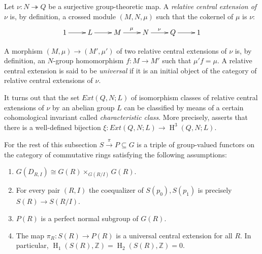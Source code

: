 \documentclass[oneside, 8pt]{amsart}
\theoremstyle{remark}
\theoremstyle{definition}
\numberwithin{lemma}{section}
\numberwithin{prop}{section}
\numberwithin{corollary}{section}
\numberwithin{externaltheorem}{section}
\DeclareMathOperator{\HH}{H}
\newcommand{\ZZ}{\mathbb{Z}}
\numberwithin{equation}{section}
\begin{document}
Let $\nu \colon N \twoheadrightarrow Q$ be a surjective group-theoretic map.
A {\it relative central extension of $\nu$} is, by definition,
a crossed module $(M, N, \mu)$ such that the cokernel of $\mu$ is $\nu$:
\begin{equation} \label{RelativeCentralExtension}
 \xymatrix{ 1 \ar[r] & L \ar[r] & M \ar^{\mu}[r] & N \ar^{\nu}[r] & Q \ar[r] & 1} \end{equation}

A morphism $(M, \mu) \to (M', \mu')$ of two relative central extensions of $\nu$ is, by definition, an $N$-group homomorphism $f\colon M \to M'$ such that $\mu' f = \mu$. 
A relative central extension is said to be {\it universal} if it is an initial object of the category of relative central extensions of $\nu$. 

It turns out that the set  $Ext(Q, N; L)$  of isomorphism classes of relative central extensions of $\nu$ by an abelian group $L$ can be classified by means of a certain cohomological invariant called {\it characteristic class}. More precisely, \cite[Th{\'e}or{\`e}me~1]{Lo78} asserts that there is a well-defined bijection $\xi \colon Ext(Q, N; L) \to \HH^3(Q, N; L)$.
 
For the rest of this subsection $S \xrightarrow{\pi} P \subseteq G$ is a triple of group-valued functors on the category of commutative rings satisfying the following assumptions:
\begin{enumerate} [label=(A\arabic*)]
 \item \label{req:left-exact} $G(D_{R, I}) \cong G(R) \times_{G(R/I)} G(R)$.
 \item \label{req:coeq} For every pair $(R, I)$ the coequalizer of $S(p_0), S(p_1)$ is precisely $S(R) \to S(R/I)$.
 \item \label{req:subfunc} $P(R)$ is a perfect normal subgroup of $G(R)$.
 \item \label{req:uce} The map $ \pi_R \colon S(R) \to P(R)$ is a universal central extension for all $R$. In particular, $\HH_1(S(R), \ZZ) = \HH_2(S(R), \ZZ) = 0$.
\end{enumerate}
\end{document}
